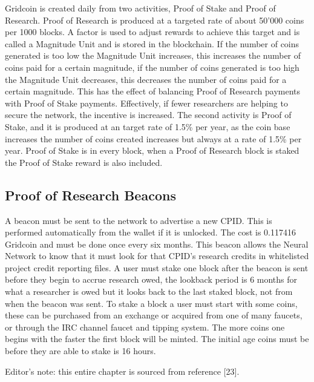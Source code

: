 Gridcoin is created daily from two activities, Proof of Stake and Proof of Research. Proof of Research is produced at a targeted rate of about 50'000 coins per 1000 blocks. A factor is used to adjust rewards to achieve this target and is called a Magnitude Unit and is stored in the blockchain. If the number of coins generated is too low the Magnitude Unit increases, this increases the number of coins paid for a certain magnitude, if the number of coins generated is too high the Magnitude Unit decreases, this decreases the number of coins paid for a certain magnitude. This has the effect of balancing Proof of Research payments with Proof of Stake payments. Effectively, if fewer researchers are helping to secure the network, the incentive is increased. The second activity is Proof of Stake, and it is produced at an target rate of 1.5\% per year, as the coin base increases the number of coins created increases but always at a rate of 1.5\% per year. Proof of Stake is in every block, when a Proof of Research block is staked the Proof of Stake reward is also included.

\subsection{Proof of Research Beacons}

A beacon must be sent to the network to advertise a new CPID. This is performed automatically from the wallet if it is unlocked. The cost is 0.117416 Gridcoin and must be done once every six months. This beacon allows the Neural Network to know that it must look for that CPID's research credits in whitelisted project credit reporting files. A user must stake one block after the beacon is sent before they begin to accrue research owed, the lookback period is 6 months for what a researcher is owed but it looks back to the last staked block, not from when the beacon was sent. To stake a block a user must start with some coins, these can be purchased from an exchange or acquired from one of many faucets, or through the IRC channel faucet and tipping system. The more coins one begins with the faster the first block will be minted.  The initial age coins must be before they are able to stake is 16 hours.

Editor's note: this entire chapter is sourced from reference [23].\\
